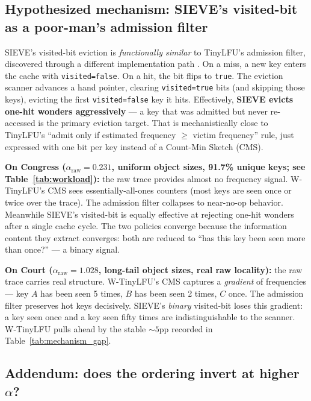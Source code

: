 \subsection{Hypothesized mechanism: SIEVE's visited-bit as a poor-man's admission filter}

SIEVE's visited-bit eviction is \emph{functionally similar} to TinyLFU's
admission filter, discovered through a different implementation path
\cite{zhang2024sieve,einziger2017tinylfu}. On a miss, a new key enters the
cache with \texttt{visited=false}. On a hit, the bit flips to \texttt{true}.
The eviction scanner advances a hand pointer, clearing \texttt{visited=true}
bits (and skipping those keys), evicting the first \texttt{visited=false} key
it hits. Effectively, \textbf{SIEVE evicts one-hit wonders aggressively} --- a
key that was admitted but never re-accessed is the primary eviction target.
That is mechanistically close to TinyLFU's ``admit only if estimated frequency
$\geq$ victim frequency'' rule, just expressed with one bit per key instead of
a Count-Min Sketch (CMS).

\textbf{On Congress ($\alpha_{\text{raw}}=0.231$, uniform object sizes, 91.7\%
unique keys; see Table~\ref{tab:workload}):} the raw trace provides almost no
frequency signal. W-TinyLFU's CMS sees essentially-all-ones counters (most keys
are seen once or twice over the trace). The admission filter collapses to
near-no-op behavior. Meanwhile SIEVE's visited-bit is equally effective at
rejecting one-hit wonders after a single cache cycle. The two policies
converge because the information content they extract converges: both are
reduced to ``has this key been seen more than once?'' --- a binary signal.

\textbf{On Court ($\alpha_{\text{raw}}=1.028$, long-tail object sizes, real raw
locality):} the raw trace carries real structure. W-TinyLFU's CMS captures a
\emph{gradient} of frequencies --- key $A$ has been seen 5 times, $B$ has been
seen 2 times, $C$ once. The admission filter preserves hot keys decisively.
SIEVE's \emph{binary} visited-bit loses this gradient: a key seen once and a
key seen fifty times are indistinguishable to the scanner. W-TinyLFU pulls
ahead by the stable $\sim 5$pp recorded in Table~\ref{tab:mechanism_gap}.

\subsection{Addendum: does the ordering invert at higher $\alpha$?}

